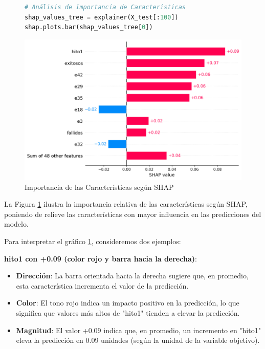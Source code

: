 \begin{figure}[H]
    \centering
    \begin{minipage}{0.48\textwidth}
        \begin{lstlisting}[language=Python, caption=Análisis de Importancia de Características, label=lst:cod_calvaloreshap]
# Análisis de Importancia de Características
shap_values_tree = explainer(X_test[:100])
shap.plots.bar(shap_values_tree[0])
        \end{lstlisting}
    \end{minipage}
    \hfill
    \begin{minipage}{0.48\textwidth}
        \centering
        \includegraphics[width=0.9\linewidth]{img/shap_rf/ImportanciaDeCaracteristicasShap.png}
        \caption{Importancia de las Características según SHAP}
        \label{fig:importancia_relativa_shap}
    \end{minipage}
\end{figure}

La Figura \ref{fig:importancia_relativa_shap} ilustra la importancia relativa de las características según SHAP, poniendo de relieve las características con mayor influencia en las predicciones del modelo.

Para interpretar el gráfico \ref{fig:importancia_relativa_shap}, consideremos dos ejemplos:

\textbf{hito1 con +0.09 (color rojo y barra hacia la derecha)}:
\begin{itemize}
    \item \textbf{Dirección}: La barra orientada hacia la derecha sugiere que, en promedio, esta característica incrementa el valor de la predicción.
    \item \textbf{Color}: El tono rojo indica un impacto positivo en la predicción, lo que significa que valores más altos de "hito1" tienden a elevar la predicción.
    \item \textbf{Magnitud}: El valor +0.09 indica que, en promedio, un incremento en "hito1" eleva la predicción en 0.09 unidades (según la unidad de la variable objetivo).
\end{itemize}


